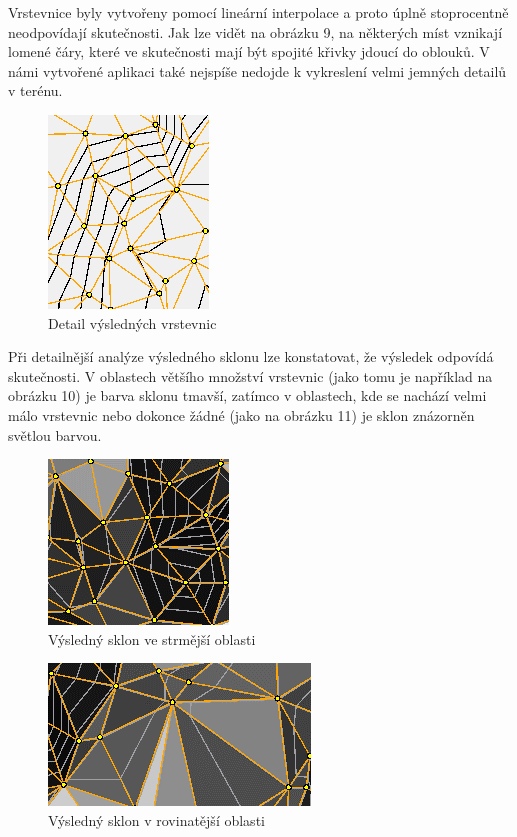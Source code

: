 \documentclass{article}
\begin{document}
\begin{spacing}{1.5}
\newpage
Vrstevnice byly vytvořeny pomocí lineární interpolace a proto úplně stoprocentně neodpovídají skutečnosti. Jak lze vidět na obrázku 9, na některých míst vznikají lomené čáry, které ve skutečnosti mají být spojité křivky jdoucí do oblouků. V námi vytvořené aplikaci také nejspíše nedojde k vykreslení velmi jemných detailů v terénu.

\begin{figure}[htbp]
    \centering
    \includegraphics[width=0.3\linewidth]{images/09detail_vrstevnic.png}
    \caption{Detail výsledných vrstevnic}
    \label{fig:enter-label}
\end{figure}

Při detailnější analýze výsledného sklonu lze konstatovat, že výsledek odpovídá skutečnosti. V oblastech většího množství vrstevnic (jako tomu je například na obrázku 10) je barva sklonu tmavší, zatímco v oblastech, kde se nachází velmi málo vrstevnic nebo dokonce žádné (jako na obrázku 11) je sklon znázorněn světlou barvou.

\begin{figure}[htbp]
    \centering
    \includegraphics[width=0.3\linewidth]{images/10sklon.png}
    \caption{Výsledný sklon ve strmější oblasti}
    \label{fig:enter-label}
\end{figure}

\begin{figure}[htbp]
    \centering
    \includegraphics[width=0.3\linewidth]{images/11sklon.png}
    \caption{Výsledný sklon v rovinatější oblasti}
    \label{fig:enter-label}
\end{figure}


\end{spacing}
\end{document}
